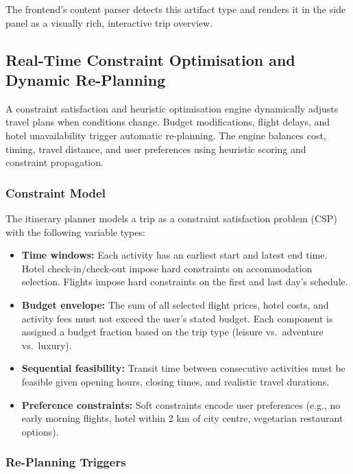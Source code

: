 \documentclass[12pt, a4paper]{article}
\begin{document}
The frontend's content parser detects this artifact type and renders it in the side panel as a visually rich, interactive trip overview.

\subsection{Real-Time Constraint Optimisation and Dynamic Re-Planning}

\begin{highlightbox}
A constraint satisfaction and heuristic optimisation engine dynamically adjusts travel plans when conditions change. Budget modifications, flight delays, and hotel unavailability trigger automatic re-planning. The engine balances cost, timing, travel distance, and user preferences using heuristic scoring and constraint propagation.
\end{highlightbox}

\subsubsection{Constraint Model}

The itinerary planner models a trip as a constraint satisfaction problem (CSP) with the following variable types:

\begin{itemize}[leftmargin=1.5cm, itemsep=0.3em]
  \item \textbf{Time windows:} Each activity has an earliest start and latest end time. Hotel check-in/check-out impose hard constraints on accommodation selection. Flights impose hard constraints on the first and last day's schedule.
  \item \textbf{Budget envelope:} The sum of all selected flight prices, hotel costs, and activity fees must not exceed the user's stated budget. Each component is assigned a budget fraction based on the trip type (leisure vs.\ adventure vs.\ luxury).
  \item \textbf{Sequential feasibility:} Transit time between consecutive activities must be feasible given opening hours, closing times, and realistic travel durations.
  \item \textbf{Preference constraints:} Soft constraints encode user preferences (e.g., no early morning flights, hotel within 2 km of city centre, vegetarian restaurant options).
\end{itemize}

\subsubsection{Re-Planning Triggers}
\end{document}
